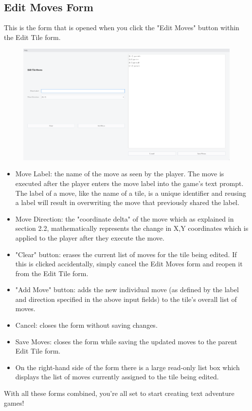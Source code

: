 \documentclass{article} \usepackage[margin=1in,headheight=57pt,headsep=0.1in]{geometry}
\begin{document}
\subsection{Edit Moves Form}
This is the form that is opened when you click the "Edit Moves" button within the Edit Tile form.
\begin{figure}[H]
	\centering
	\includegraphics[width=1.0\textwidth]{./editMovesForm.png}
\end{figure}
\begin{itemize}
	\item Move Label: the name of the move as seen by the player. The move is executed after the player enters the move label into the game's text prompt. The label of a move, like the name of a tile, is a unique identifier and reusing a label will result in overwriting the move that previously shared the label.
	\item Move Direction: the "coordinate delta" of the move which as explained in section 2.2, mathematically represents the change in X,Y coordinates which is applied to the player after they execute the move.
	\item "Clear" button: erases the current list of moves for the tile being edited. If this is clicked accidentally, simply cancel the Edit Moves form and reopen it from the Edit Tile form.
	\item "Add Move" button: adds the new individual move (as defined by the label and direction specified in the above input fields) to the tile's overall list of moves.
	\item Cancel: closes the form without saving changes.
	\item Save Moves: closes the form while saving the updated moves to the parent Edit Tile form.
	\item On the right-hand side of the form there is a large read-only list box which displays the list of moves currently assigned to the tile being edited.
\end{itemize}
With all these forms combined, you're all set to start creating text adventure games!
\newpage
\end{document}
